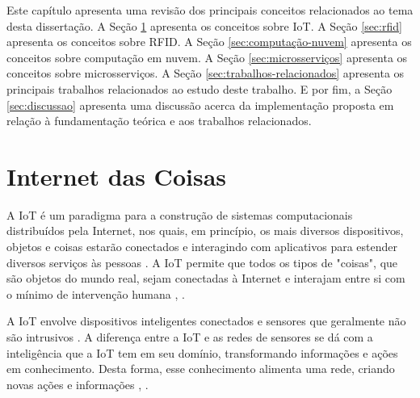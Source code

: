\label{cap:fundamentacao}

Este capítulo apresenta uma revisão dos principais conceitos relacionados ao tema desta dissertação. A Seção \ref{sec:iot} apresenta os conceitos sobre \acrlong{IoT}. A Seção \ref{sec:rfid} apresenta os conceitos sobre \acrlong{RFID}. A Seção \ref{sec:computação-nuvem} apresenta os conceitos sobre computação em nuvem. A Seção \ref{sec:microsserviços} apresenta os conceitos sobre microsserviços. A Seção \ref{sec:trabalhos-relacionados} apresenta os principais trabalhos relacionados ao estudo deste trabalho. E por fim, a Seção \ref{sec:discussao} apresenta uma discussão acerca da implementação proposta em relação à fundamentação teórica e aos trabalhos relacionados.

\section{Internet das Coisas}
\label{sec:iot}




A \acrshort{IoT} é um paradigma para a construção de sistemas computacionais distribuídos pela Internet, nos quais, em princípio, os mais diversos dispositivos, objetos e coisas estarão conectados e interagindo com aplicativos para estender diversos serviços às pessoas \cite{Gubbi2013} \cite{Filho2017DesignNetworks}. A \acrshort{IoT} permite que todos os tipos de "coisas", que são objetos do mundo real, sejam conectadas à Internet e interajam entre si com o mínimo de intervenção humana \cite{Perera2014}, \cite{Khan2012}.

A \acrshort{IoT} envolve dispositivos inteligentes conectados e sensores que geralmente não são intrusivos \cite{Rayes2017}. A diferença entre a \acrshort{IoT} e as redes de sensores se dá com a inteligência que a \acrshort{IoT} tem em seu domínio, transformando informações e ações em conhecimento. Desta forma, esse conhecimento alimenta uma rede, criando novas ações e informações \cite{Gubbi2013}, \cite{Botta2014}.

